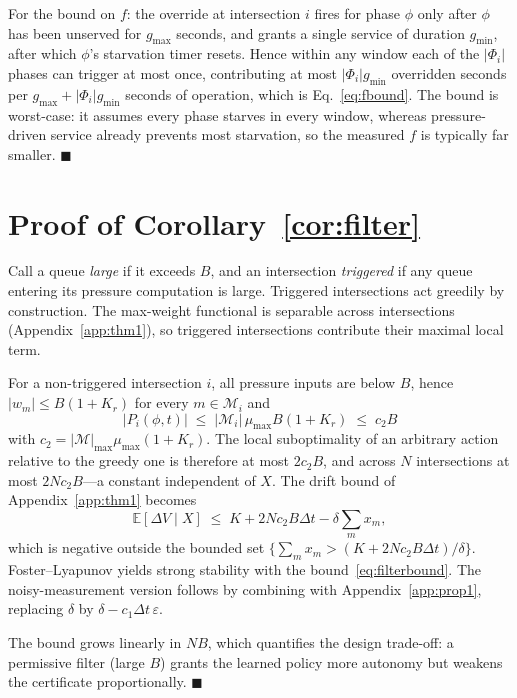\documentclass[journal]{IEEEtran}
\newcommand{\Mset}{\mathcal{M}}
\begin{document}
For the bound on $f$: the override at intersection $i$ fires for phase
$\phi$ only after $\phi$ has been unserved for $g_{\max}$ seconds, and
grants a single service of duration $g_{\min}$, after which $\phi$'s
starvation timer resets. Hence within any window each of the $|\Phi_i|$
phases can trigger at most once, contributing at most
$|\Phi_i| g_{\min}$ overridden seconds per $g_{\max} + |\Phi_i| g_{\min}$
seconds of operation, which is Eq.~\eqref{eq:fbound}. The bound is
worst-case: it assumes every phase starves in every window, whereas
pressure-driven service already prevents most starvation, so the measured
$f$ is typically far smaller. \hfill$\blacksquare$

\section{Proof of Corollary~\ref{cor:filter}}
\label{app:cor1}
Call a queue \emph{large} if it exceeds $B$, and an intersection
\emph{triggered} if any queue entering its pressure computation is large.
Triggered intersections act greedily by construction. The max-weight
functional is separable across intersections
(Appendix~\ref{app:thm1}), so triggered intersections contribute their
maximal local term.

For a non-triggered intersection $i$, all pressure inputs are below $B$,
hence $|w_m| \le B(1+K_r)$ for every $m\in\Mset_i$ and
\begin{equation}
\big|P_i(\phi,t)\big| \;\le\; |\Mset_i|\,\mu_{\max} B (1+K_r)
 \;\le\; c_2 B
\end{equation}
with $c_2 = |\Mset|_{\max}\mu_{\max}(1+K_r)$. The local suboptimality of
an arbitrary action relative to the greedy one is therefore at most
$2c_2 B$, and across $N$ intersections at most $2Nc_2B$---a constant
independent of $X$. The drift bound of Appendix~\ref{app:thm1} becomes
\begin{equation}
\mathbb{E}[\Delta V \mid X] \;\le\; K + 2Nc_2B\Delta t
 - \delta \sum_m x_m ,
\end{equation}
which is negative outside the bounded set
$\{\sum_m x_m > (K + 2Nc_2B\Delta t)/\delta\}$. Foster--Lyapunov yields
strong stability with the bound~\eqref{eq:filterbound}. The
noisy-measurement version follows by combining with
Appendix~\ref{app:prop1}, replacing $\delta$ by
$\delta - c_1\Delta t\,\varepsilon$.

The bound grows linearly in $NB$, which quantifies the design trade-off:
a permissive filter (large $B$) grants the learned policy more autonomy
but weakens the certificate proportionally. \hfill$\blacksquare$
\end{document}
